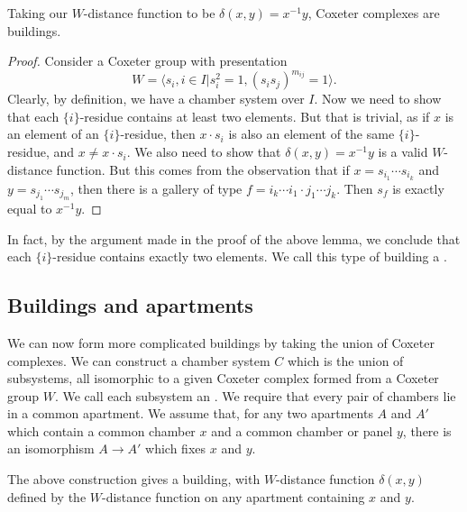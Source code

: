 \documentclass[11pt]{article}
\begin{document}
\begin{lemma}\label{cox}
    Taking our $W$-distance function to be $\delta(x,y)=x^{-1}y$, Coxeter complexes are buildings.
\end{lemma}

\begin{proof}
    Consider a Coxeter group with presentation
    \[W=\langle s_i,i\in I|s_i^2=1,(s_is_j)^{m_{ij}}=1\rangle.\]
    Clearly, by definition, we have a chamber system over $I$. Now we need to show that each $\{i\}$-residue contains at least two elements. But that is trivial, as if $x$ is an element of an $\{i\}$-residue, then $x\cdot s_i$ is also an element of the same $\{i\}$-residue, and $x\neq x\cdot s_i$. 
    We also need to show that $\delta(x,y)=x^{-1}y$ is a valid $W$-distance function. But this comes from the observation that if $x=s_{i_1}\cdots s_{i_k}$ and $y=s_{j_1}\cdots s_{j_m}$, then there is a gallery of type $f=i_k\cdots i_1 \cdot j_1\cdots j_k$. Then $s_f$ is exactly equal to $x^{-1}y$. 
\end{proof}

In fact, by the argument made in the proof of the above lemma, we conclude that each $\{i\}$-residue contains exactly two elements. We call this type of building a .


\subsection{Buildings and apartments}\label{apartments}
We can now form more complicated buildings by taking the union of Coxeter complexes. We can construct a chamber system $C$ which is the union of subsystems, all isomorphic to a given Coxeter complex formed from a Coxeter group $W$. We call each subsystem an . We require that every pair of chambers lie in a common apartment. We assume that, for any two apartments $A$ and $A'$ which contain a common chamber $x$ and a common chamber or panel $y$, there is an isomorphism $A\to A'$ which fixes $x$ and $y$.  

\begin{theorem}
    The above construction gives a building, with $W$-distance function $\delta(x,y)$ defined by the $W$-distance function on any apartment containing $x$ and $y$. 
\end{theorem}
\end{document}
